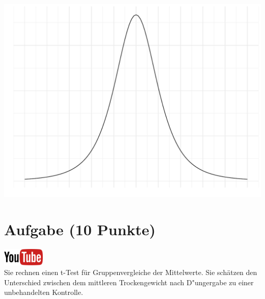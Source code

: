 \documentclass[a4paper, 9pt]{scrartcl}\usepackage[]{graphicx}\usepackage[]{xcolor}
\makeatletter
\def\maxwidth{ %
  \ifdim\Gin@nat@width>\linewidth
    \linewidth
  \else
    \Gin@nat@width
  \fi
}
\makeatother
\begin{document}
{\centering \includegraphics[width=\maxwidth]{img/statistisches-testen-3-1} 

}


 
\clearpage

\section{Aufgabe \hfill (10 Punkte)}

\hfill\href{https://youtu.be/CN_O4fYPbhs}{\includegraphics[width =
  2cm]{img/youtube}}\\[1Ex]



Sie rechnen einen t-Test f{\"u}r Gruppenvergleiche der Mittelwerte. Sie
sch{\"a}tzen den Unterschied zwischen dem mittleren Trockengewicht nach D{"u}ngergabe zu einer unbehandelten
Kontrolle.
\end{document}
